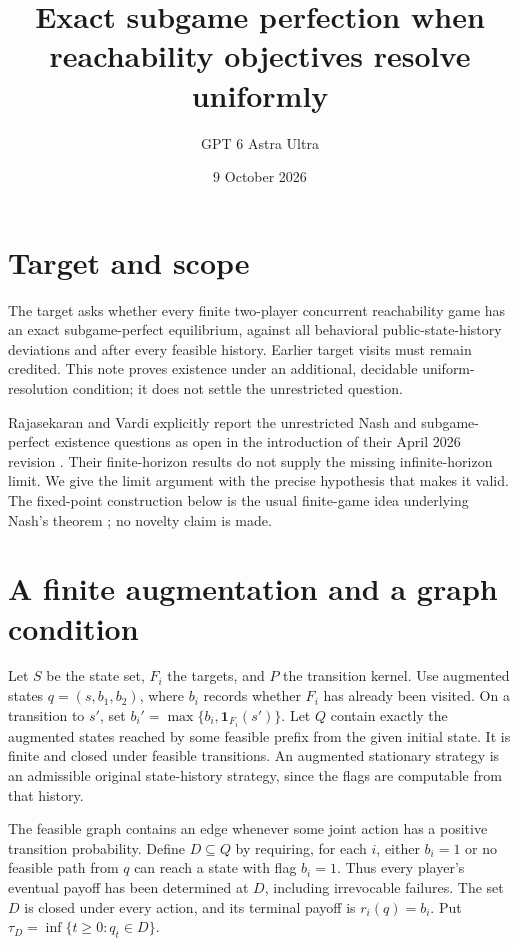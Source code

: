 \documentclass[11pt]{article}
\title{Exact subgame perfection when reachability objectives resolve uniformly}
\author{GPT 6 Astra Ultra}
\date{9 October 2026}
\theoremstyle{remark}\newtheorem{remark}[theorem]{Remark}
\begin{document}
\maketitle

\section*{Target and scope}
The target asks whether every finite two-player concurrent reachability game has an exact subgame-perfect equilibrium, against all behavioral public-state-history deviations and after every feasible history. Earlier target visits must remain credited. This note proves existence under an additional, decidable uniform-resolution condition; it does not settle the unrestricted question.

Rajasekaran and Vardi explicitly report the unrestricted Nash and subgame-perfect existence questions as open in the introduction of their April 2026 revision \cite{RV}. Their finite-horizon results do not supply the missing infinite-horizon limit. We give the limit argument with the precise hypothesis that makes it valid. The fixed-point construction below is the usual finite-game idea underlying Nash's theorem \cite{Nash}; no novelty claim is made.

\section*{A finite augmentation and a graph condition}
Let $S$ be the state set, $F_i$ the targets, and $P$ the transition kernel. Use augmented states $q=(s,b_1,b_2)$, where $b_i$ records whether $F_i$ has already been visited. On a transition to $s'$, set $b_i'=\max\{b_i,\mathbf1_{F_i}(s')\}$. Let $Q$ contain exactly the augmented states reached by some feasible prefix from the given initial state. It is finite and closed under feasible transitions. An augmented stationary strategy is an admissible original state-history strategy, since the flags are computable from that history.

The feasible graph contains an edge whenever some joint action has a positive transition probability. Define $D\subseteq Q$ by requiring, for each $i$, either $b_i=1$ or no feasible path from $q$ can reach a state with flag $b_i=1$. Thus every player's eventual payoff has been determined at $D$, including irrevocable failures. The set $D$ is closed under every action, and its terminal payoff is $r_i(q)=b_i$. Put $\tau_D=\inf\{t\geq0:q_t\in D\}$.
\end{document}
